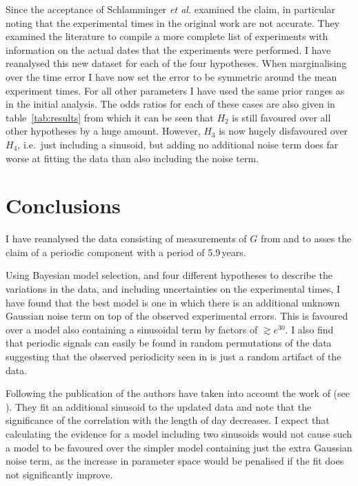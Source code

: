 \documentclass[doublecol]{epl2}
\begin{document}
Since the acceptance of \cite{2015EL....11010002A} Schlamminger {\it et al.} \cite{2015arXiv150501774S}
examined the claim, in particular noting that the experimental times in the original work
are not accurate. They examined the literature to compile a more complete list of
experiments with information on the actual dates that the experiments were performed.
I have reanalysed this new dataset for each of the four hypotheses. When marginalising over the
time error I have now set the error to be symmetric around the mean experiment times.
For all other parameters I have used the same prior ranges as in the initial analysis.
The odds ratios for each of these cases are also given in table~\ref{tab:results} from which it can
be seen that $H_2$ is still favoured over all other hypotheses by a huge amount. However, $H_3$
is now hugely disfavoured over $H_4$, i.e.\ just including a sinusoid, but adding no additional noise
term does far worse at fitting the data than also including the noise term.

\section{Conclusions}

I have reanalysed the data consisting of measurements of $G$ from
\cite{2015EL....11010002A} and \cite{2015arXiv150501774S} to asses the claim of a periodic
component with a period of 5.9\,years.

Using Bayesian model selection, and four different hypotheses to describe the variations in the data, and including
uncertainties on the experimental times, I have found that the best model is one in which
there is an additional unknown Gaussian noise term on top of the observed experimental errors. This is 
favoured over a model also containing a sinusoidal term by factors of $\gtrsim e^{30}$. I also find that periodic
signals can easily be found in random permutations of the data suggesting that the observed periodicity seen in
\cite{2015EL....11010002A} is just a random artifact of the data.

Following the publication of \cite{2015EL....11010002A} the authors have taken into account the work of \cite{2015arXiv150501774S} (see \cite{AndersonRevised}). They fit an additional
sinusoid to the updated data and note that the significance of the correlation with the length of day decreases. 
I expect that calculating the evidence for a model including two sinusoids would not cause such a model to be
favoured over the simpler model containing just the
extra Gaussian noise term, as the increase in parameter space would be penalised if the fit does not 
significantly improve.
\end{document}
